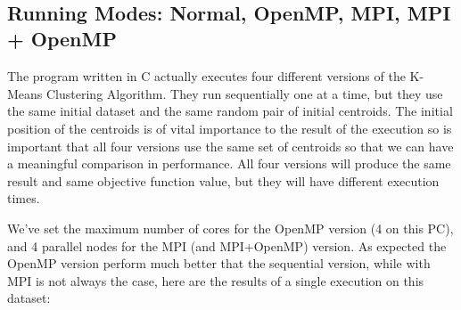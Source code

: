 \documentclass[11pt]{article}
\begin{document}
    \begin{center}
    \end{center}
    { \hspace*{\fill} \\}
    
    \hypertarget{running-modes-normal-openmp-mpi-mpi-openmp}{%
\subsection{Running Modes: Normal, OpenMP, MPI, MPI +
OpenMP}\label{running-modes-normal-openmp-mpi-mpi-openmp}}

    The program written in C actually executes four different versions of
the K-Means Clustering Algorithm. They run sequentially one at a time,
but they use the same initial dataset and the same random pair of
initial centroids. The initial position of the centroids is of vital
importance to the result of the execution so is important that all four
versions use the same set of centroids so that we can have a meaningful
comparison in performance. All four versions will produce the same
result and same objective function value, but they will have different
execution times.

We've set the maximum number of cores for the OpenMP version (4 on this
PC), and 4 parallel nodes for the MPI (and MPI+OpenMP) version. As
expected the OpenMP version perform much better that the sequential
version, while with MPI is not always the case, here are the results of
a single execution on this dataset:
\end{document}
